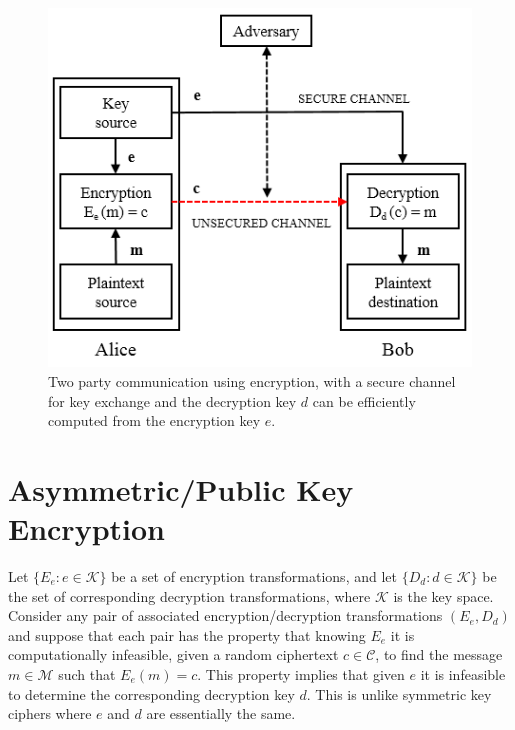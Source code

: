 	\begin{figure}[h!]
	 	\centering
	 	\includegraphics{images/symmetric-key.png}
	 	\caption{Two party communication using encryption, with a secure channel for key exchange and the decryption key $d$ can be efficiently computed from the encryption key $e$. }
	 	\label{fig:symmetric-key}
	 \end{figure} 

\section{Asymmetric/Public Key Encryption}
	Let $\{E_{e}: e \in \mathcal{K}\}$ be a set of encryption transformations, and let $\{D_{d}: d \in \mathcal{K}\}$ be the set of corresponding decryption transformations, where $\mathcal{K}$ is the key space.
	Consider any pair of associated encryption/decryption transformations $(E_{e},D_{d})$ and suppose that each pair has the property that knowing $E_{e}$ it is computationally infeasible, given a random ciphertext $c \in \mathcal{C}$, to find the message $m \in \mathcal{M}$ such that $E_{e}(m) = c$.
	This property implies that given $e$ it is infeasible to determine the corresponding decryption key $d$.
	This is unlike symmetric key ciphers where $e$ and $d$ are essentially the same\cite{menezes2010handbook}.


